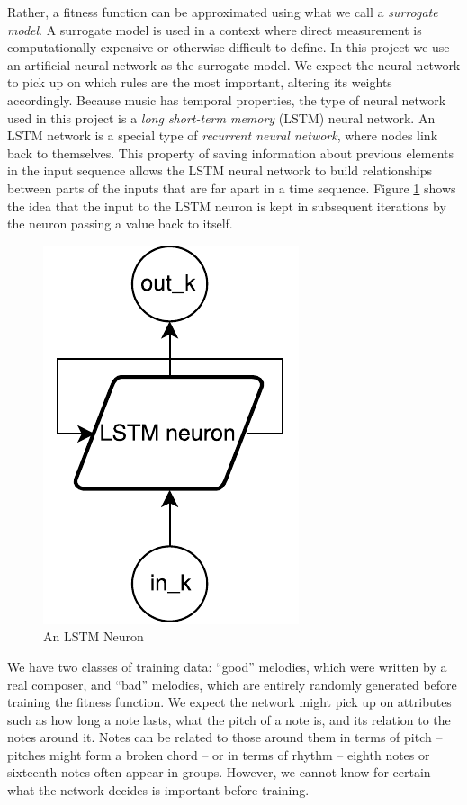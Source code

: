 Rather, a fitness function can be approximated using what we call a \textit{surrogate model}.
A surrogate model is used in a context where direct measurement is computationally expensive or otherwise difficult to define.
In this project we use an artificial neural network as the surrogate model.
We expect the neural network to pick up on which rules are the most important, altering its weights accordingly.
Because music has temporal properties, the type of neural network used in this project is a \textit{long short-term memory} (LSTM) neural network.
An LSTM network is a special type of \textit{recurrent neural network}, where nodes link back to themselves.
This property of saving information about previous elements in the input sequence allows the LSTM neural network to build relationships between parts of the inputs that are far apart in a time sequence.
Figure \ref{fig:lstm_cell} shows the idea that the input to the LSTM neuron is kept in subsequent iterations by the neuron passing a value back to itself.

\begin{figure}[h]
	\centering
	\includegraphics{figures/lstm_cell.pdf}
	\caption{An LSTM Neuron}
	\label{fig:lstm_cell}
\end{figure}

We have two classes of training data: ``good'' melodies, which were written by a real composer, and ``bad'' melodies, which are entirely randomly generated before training the fitness function.
We expect the network might pick up on attributes such as how long a note lasts, what the pitch of a note is, and its relation to the notes around it.
Notes can be related to those around them in terms of pitch -- pitches might form a broken chord -- or in terms of rhythm -- eighth notes or sixteenth notes often appear in groups.
However, we cannot know for certain what the network decides is important before training.

